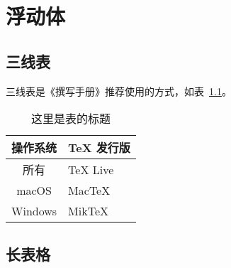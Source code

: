 \chapter{浮动体}

\section{三线表}

三线表是《撰写手册》推荐使用的方式，如表~\ref{tab:exampletable}。
\begin{table}[htbp]
  \centering
  \caption{这里是表的标题}
  \label{tab:exampletable}
  \begin{tabular}{cl}
    \toprule
    操作系统 & TeX 发行版 \\
    \midrule
    所有 & TeX Live \\
    macOS & MacTeX \\
    Windows & MikTeX \\
    \bottomrule
  \end{tabular}
\end{table}



\section{长表格}

